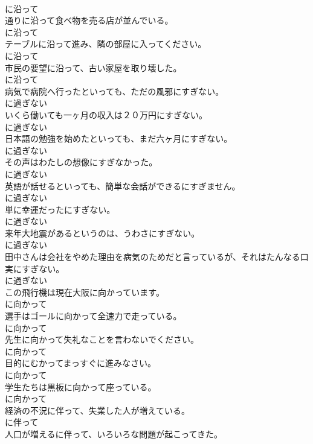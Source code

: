 \documentclass[8pt]{extreport}
\begin{document}
\begin{CJK}{UTF8}{min}
\\	に沿って	
\\	通りに沿って食べ物を売る店が並んでいる。	
\\	に沿って	
\\	テーブルに沿って進み、隣の部屋に入ってください。	
\\	に沿って	
\\	市民の要望に沿って、古い家屋を取り壊した。	
\\	に沿って	
\\	病気で病院へ行ったといっても、ただの風邪にすぎない。	
\\	に過ぎない	
\\	いくら働いても一ヶ月の収入は２０万円にすぎない。	
\\	に過ぎない	
\\	日本語の勉強を始めたといっても、まだ六ヶ月にすぎない。	
\\	に過ぎない	
\\	その声はわたしの想像にすぎなかった。	
\\	に過ぎない	
\\	英語が話せるといっても、簡単な会話ができるにすぎません。	
\\	に過ぎない	
\\	単に幸運だったにすぎない。	
\\	に過ぎない	
\\	来年大地震があるというのは、うわさにすぎない。	
\\	に過ぎない	
\\	田中さんは会社をやめた理由を病気のためだと言っているが、それはたんなる口実にすぎない。	
\\	に過ぎない	
\\	この飛行機は現在大阪に向かっています。	
\\	に向かって	
\\	選手はゴールに向かって全速力で走っている。	
\\	に向かって	
\\	先生に向かって失礼なことを言わないでください。	
\\	に向かって	
\\	目的にむかってまっすぐに進みなさい。	
\\	に向かって	
\\	学生たちは黒板に向かって座っている。	
\\	に向かって	
\\	経済の不況に伴って、失業した人が増えている。	
\\	に伴って	
\\	人口が増えるに伴って、いろいろな問題が起こってきた。	

\end{CJK}
\end{document}
